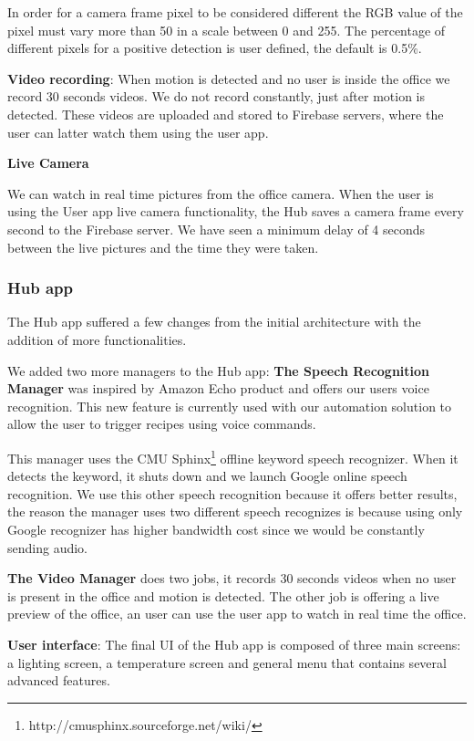 \documentclass[conference]{IEEEtran}
\begin{document}
In order for a camera frame pixel to be considered different the RGB value of the pixel must vary more than 50 in a scale between 0 and 255. The percentage of different pixels for a positive detection is user defined, the default is 0.5\%.


\textbf{Video recording}: When motion is detected and no user is inside the office we record 30 seconds videos. We do not record constantly, just after motion is detected. These videos are uploaded and stored to Firebase servers, where the user can latter watch them using the user app.

\textbf{Live Camera}

We can watch in real time pictures from the office camera. When the user is using the User app live camera functionality, the Hub saves a camera frame every second to the Firebase server. We have seen a minimum delay of 4 seconds between the live pictures and the time they were taken.



\subsubsection{Hub app}

The Hub app suffered a few changes from the initial architecture with the addition of more functionalities.

We added two more managers to the Hub app: 
\textbf{The Speech Recognition Manager} was inspired by Amazon Echo product and offers our users voice recognition. This new feature is currently used with our automation solution to allow the user to trigger recipes using voice commands. 

This manager uses the CMU Sphinx\footnote{http://cmusphinx.sourceforge.net/wiki/} offline keyword speech recognizer. When it detects the keyword, it shuts down and we launch Google online speech recognition. We use this other speech recognition because it offers better results, the reason the manager uses two different speech recognizes is because using only Google recognizer has higher bandwidth cost since we would be constantly sending audio. 

\textbf{The Video Manager} does two jobs, it records 30 seconds videos when no user is present in the office and motion is detected. The other job is offering a live preview of the office, an user can use the user app to watch in real time the office.



\textbf{User interface}: The final \ac{UI} of the Hub app is composed of three main screens: a lighting screen, a temperature screen and general menu that contains several advanced features.
\end{document}
